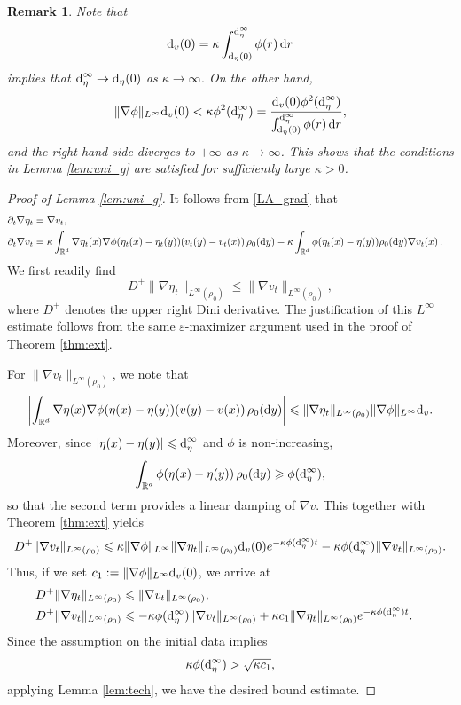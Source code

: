 \documentclass[10pt,reqno]{amsart}
\renewcommand{\ge}{\geqslant}
\renewcommand{\leq}{\leqslant}
\renewcommand{\le}{\leqslant}
\numberwithin{equation}{section}
\newtheorem{remark}{Remark}[section]
\newcommand{\R}{\mathbb R}
\newcommand{\lt}{\left}
\newcommand{\rt}{\right}
\newcommand{\pa}{\partial}
\newcommand{\intr}{\int_{\R^d}}
\newcommand{\rd}{\textnormal{d}}
\newcommand{\dr}{\textnormal{d}r}
\newcommand{\dy}{\textnormal{d}y}
\begin{document}
\begin{remark} Note that 
\[
\rd_v(0) =   \kappa \int_{\rd_\eta(0)}^{\rd_\eta^\infty} \phi(r)\,\dr
 \] 
 implies that $\rd_\eta^\infty \to \rd_\eta(0)$ as $\kappa \to \infty$. On the other hand, 
 \[
   \|\nabla\phi\|_{L^\infty} \rd_v(0) < \kappa \phi^2(\rd_\eta^\infty) = \frac{\rd_v(0) \phi^2(\rd_\eta^\infty)}{\int_{\rd_\eta(0)}^{\rd_\eta^\infty} \phi(r)\,\dr},
\]
and the right-hand side diverges to $+\infty$ as $\kappa \to \infty$. This shows that the conditions in Lemma \ref{lem:uni_g} are satisfied for sufficiently large $\kappa > 0$.
\end{remark}

\begin{proof}[Proof of Lemma \ref{lem:uni_g}] It follows from \eqref{LA_grad} that
\begin{align*}
\pa_t \nabla \eta_t &= \nabla v_t, \cr
\pa_t \nabla v_t &= \kappa \intr \nabla \eta_t(x) \nabla\phi(\eta_t(x) - \eta_t(y)) (v_t(y) - v_t(x))\,\rho_0(\dy)   - \kappa \intr \phi(\eta_t(x) - \eta(y))   \rho_0(\dy)\nabla v_t(x)\,.
\end{align*}
We first readily find
\[
D^+ \|\nabla \eta_t\|_{L^\infty(\rho_0)} \leq \|\nabla v_t\|_{L^\infty(\rho_0)},
\]
where $D^+$ denotes the upper right Dini derivative. The justification of this $L^\infty$ estimate follows from the same $\varepsilon$-maximizer argument used in the proof of Theorem \ref{thm:ext}.

For $\|\nabla v_t\|_{L^\infty(\rho_0)}$, we note that 
\[
\lt| \intr \nabla \eta(x) \nabla\phi(\eta(x) - \eta(y))  (v(y) - v(x))\,\rho_0(\dy)\rt| \leq \|\nabla \eta_t\|_{L^\infty(\rho_0)}\|\nabla\phi\|_{L^\infty} \rd_v.
\] 
Moreover, since $|\eta(x)-\eta(y)|\le \rd_\eta^\infty$ and $\phi$ is non-increasing,
\[
\intr \phi(\eta(x)-\eta(y))\,\rho_0(\dy)\ge \phi(\rd_\eta^\infty),
\]
so that the second term provides a linear damping of $\nabla v$. This together with Theorem \ref{thm:ext} yields
\[
D^+ \|\nabla v_t\|_{L^\infty(\rho_0)} \leq \kappa \|\nabla\phi\|_{L^\infty}\|\nabla \eta_t\|_{L^\infty(\rho_0)} \rd_v(0) e^{- \kappa \phi(\rd_\eta^\infty) t} - \kappa \phi(\rd_\eta^\infty)\|\nabla v_t\|_{L^\infty(\rho_0)}.
\] 
Thus, if we set $c_1 :=  \|\nabla\phi\|_{L^\infty} \rd_v(0)$, we arrive at
\begin{align*}
D^+ \|\nabla \eta_t\|_{L^\infty(\rho_0)} &\leq \|\nabla v_t\|_{L^\infty(\rho_0)}, \cr
D^+ \|\nabla v_t\|_{L^\infty(\rho_0)} &\leq - \kappa \phi(\rd_\eta^\infty)\|\nabla v_t\|_{L^\infty(\rho_0)} + \kappa c_1 \|\nabla \eta_t\|_{L^\infty(\rho_0)}   e^{- \kappa \phi(\rd_\eta^\infty) t} .
\end{align*}
Since the assumption on the initial data implies
\[
\kappa \phi(\rd_\eta^\infty) > \sqrt{\kappa c_1},
\]
applying Lemma \ref{lem:tech}, we have the desired bound estimate.
  \end{proof}
  
\end{document}
